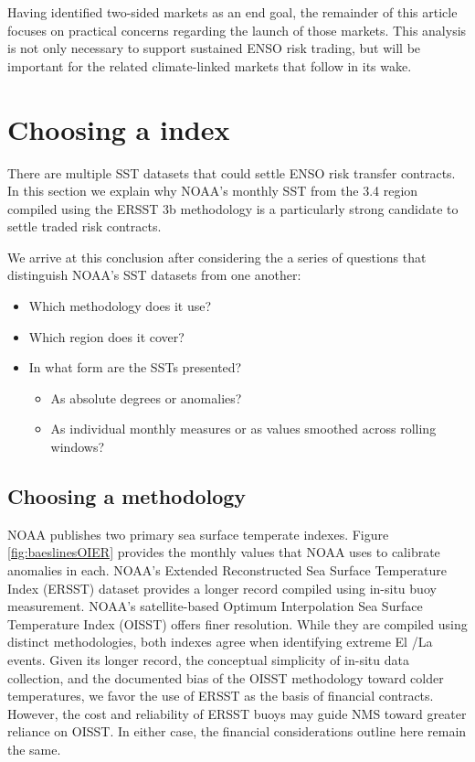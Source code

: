 \documentclass[article]{jss}
\begin{document}
Having identified two-sided markets as an end goal, the remainder of
this article focuses on practical concerns regarding the launch of those
markets. This analysis is not only necessary to support sustained ENSO
risk trading, but will be important for the related climate-linked
markets that follow in its wake.

\section{Choosing a index}\label{choosing-a-index}

There are multiple SST datasets that could settle ENSO risk transfer
contracts. In this section we explain why NOAA's monthly SST from the
 3.4 region compiled using the ERSST 3b methodology is a
particularly strong candidate to settle traded risk contracts.

We arrive at this conclusion after considering the a series of questions
that distinguish NOAA's SST datasets from one another:

\begin{itemize}
\itemsep1pt\parskip0pt
\item
  Which methodology does it use?
\item
  Which region does it cover?
\item
  In what form are the SSTs presented?

  \begin{itemize}
  \itemsep1pt\parskip0pt
  \item
    As absolute degrees or anomalies?
  \item
    As individual monthly measures or as values smoothed across rolling
    windows?
  \end{itemize}
\end{itemize}

\subsection{Choosing a methodology}\label{choosing-a-methodology}

NOAA publishes two primary sea surface temperate indexes. Figure
\ref{fig:baeslinesOIER} provides the monthly values that NOAA uses to
calibrate anomalies in each. NOAA's Extended Reconstructed Sea Surface
Temperature Index (ERSST) dataset provides a longer record compiled
using in-situ buoy measurement. NOAA's satellite-based Optimum
Interpolation Sea Surface Temperature Index (OISST) offers finer
resolution. While they are compiled using distinct methodologies, both
indexes agree when identifying extreme El /La 
events. Given its longer record, the conceptual simplicity of in-situ
data collection, and the documented bias of the OISST methodology toward
colder temperatures, we favor the use of ERSST as the basis of financial
contracts. However, the cost and reliability of ERSST buoys may guide
NMS toward greater reliance on OISST. In either case, the financial
considerations outline here remain the same.
\end{document}
